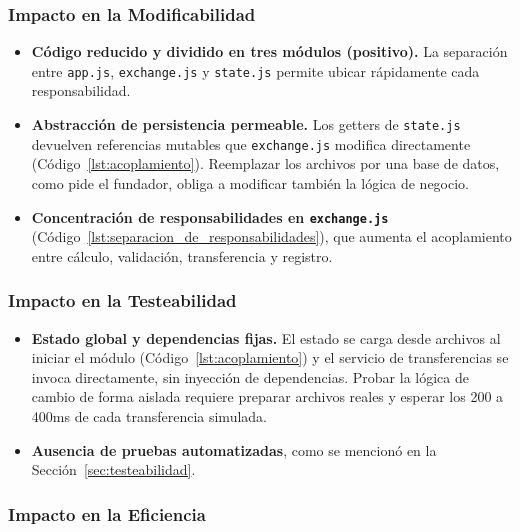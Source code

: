         \subsubsection{Impacto en la Modificabilidad}
        \label{sec:impacto_en_la_modificabilidad}

        \begin{itemize}
            \item \textbf{Código reducido y dividido en tres módulos (positivo).} La
            separación entre \texttt{app.js}, \texttt{exchange.js} y \texttt{state.js}
            permite ubicar rápidamente cada responsabilidad.
            \item \textbf{Abstracción de persistencia permeable.} Los getters de
            \texttt{state.js} devuelven referencias mutables que \texttt{exchange.js}
            modifica directamente (Código~\ref{lst:acoplamiento}). Reemplazar los archivos
            por una base de datos, como pide el fundador, obliga a modificar también la
            lógica de negocio.
            \item \textbf{Concentración de responsabilidades en \texttt{exchange.js}}
            (Código~\ref{lst:separacion_de_responsabilidades}), que aumenta el
            acoplamiento entre cálculo, validación, transferencia y registro.
        \end{itemize}

        \subsubsection{Impacto en la Testeabilidad}
        \label{sec:impacto_en_la_testeabilidad}

        \begin{itemize}
            \item \textbf{Estado global y dependencias fijas.} El estado se carga desde
            archivos al iniciar el módulo (Código~\ref{lst:acoplamiento}) y el servicio de transferencias se invoca
            directamente, sin inyección de dependencias. Probar la lógica de cambio de
            forma aislada requiere preparar archivos reales y esperar los 200 a 400ms de
            cada transferencia simulada.
            \item \textbf{Ausencia de pruebas automatizadas}, como se mencionó en la
            Sección~\ref{sec:testeabilidad}.
        \end{itemize}

        \subsubsection{Impacto en la Eficiencia}
        \label{sec:impacto_en_la_eficiencia}

